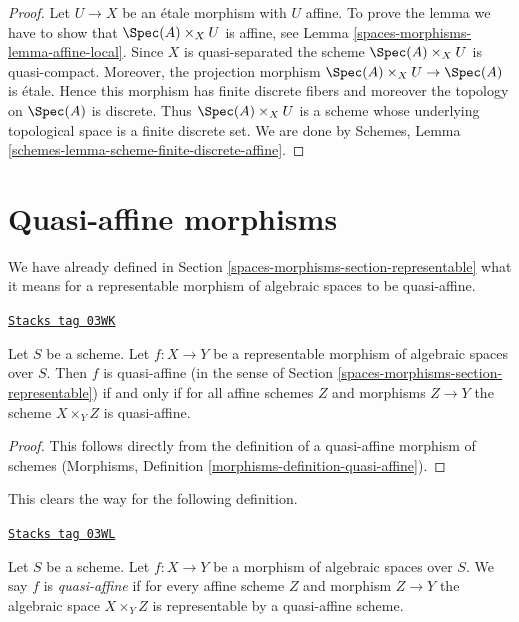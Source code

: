 \begin{proof}
Let $U \to X$ be an \'etale morphism with $U$ affine. To prove the
lemma we have to show that $\Spec(A) \times_X U$ is affine, see
Lemma \ref{spaces-morphisms-lemma-affine-local}. Since $X$ is quasi-separated the
scheme $\Spec(A) \times_X U$ is quasi-compact. Moreover, the
projection morphism $\Spec(A) \times_X U \to \Spec(A)$ is \'etale.
Hence this morphism has finite discrete fibers and moreover
the topology on $\Spec(A)$ is discrete. Thus $\Spec(A) \times_X U$
is a scheme whose underlying topological
space is a finite discrete set. We are done by
Schemes, Lemma \ref{schemes-lemma-scheme-finite-discrete-affine}.
\end{proof}

\section{Quasi-affine morphisms}
\label{spaces-morphisms-section-quasi-affine}
We have already defined in Section \ref{spaces-morphisms-section-representable}
what it means for a representable morphism of algebraic spaces
to be quasi-affine.

\begin{lemma}
\label{spaces-morphisms-lemma-quasi-affine-representable}
\href{https://stacks.math.columbia.edu/tag/03WK}{\texttt{Stacks tag 03WK}}

Let $S$ be a scheme. Let $f : X \to Y$ be a representable
morphism of algebraic spaces over $S$. Then
$f$ is quasi-affine (in the sense of Section \ref{spaces-morphisms-section-representable})
if and only if for all affine schemes $Z$
and morphisms $Z \to Y$ the scheme $X \times_Y Z$ is quasi-affine.
\end{lemma}

\begin{proof}
This follows directly from the definition of a quasi-affine morphism
of schemes
(Morphisms, Definition \ref{morphisms-definition-quasi-affine}).
\end{proof}

This clears the way for the following definition.

\begin{definition}
\label{spaces-morphisms-definition-quasi-affine}
\href{https://stacks.math.columbia.edu/tag/03WL}{\texttt{Stacks tag 03WL}}

Let $S$ be a scheme.
Let $f : X \to Y$ be a morphism of algebraic spaces over $S$.
We say $f$ is {\it quasi-affine} if for every affine scheme $Z$ and
morphism $Z \to Y$ the algebraic space $X \times_Y Z$ is representable
by a quasi-affine scheme.
\end{definition}

